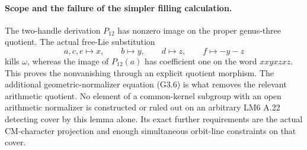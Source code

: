 \paragraph{Scope and the failure of the simpler filling calculation.}
The two-handle derivation $P_{12}$ has nonzero image on
the proper genus-three quotient. The actual free-Lie
substitution
\[
 a,c,e\mapsto x,\qquad b\mapsto y,\qquad d\mapsto z,
 \qquad f\mapsto-y-z
\]
kills $\omega$, whereas the image of $P_{12}(a)$ has
coefficient one on the word $xxyxzxz$. This proves the
nonvanishing through an explicit quotient morphism.
The additional geometric-normalizer equation (G3.6)
is what removes the relevant arithmetic quotient.
No element of a common-kernel subgroup with an open
arithmetic normalizer is constructed or ruled out on
an arbitrary LM6 A.22 detecting cover by this lemma
alone. Its exact further requirements are the actual
CM-character projection and enough simultaneous
orbit-line constraints on that cover.
